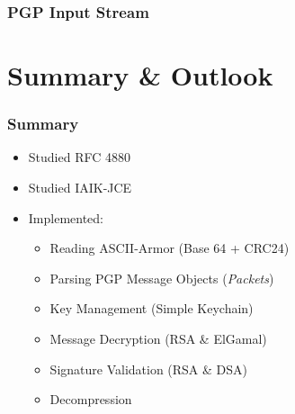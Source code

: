 \documentclass{beamer}
\begin{document}

\begin{frame}[fragile]
	\frametitle{PGP Input Stream}
	
\end{frame}

\section{Summary \&{} Outlook}

\begin{frame}
	\frametitle{Summary}
	
	\begin{itemize}
		\item Studied RFC 4880
		\item Studied IAIK-JCE
		\item Implemented:
		\begin{itemize}
			\item Reading ASCII-Armor (Base 64 + CRC24)
			\item Parsing PGP Message Objects (\textit{Packets})
			\item Key Management (Simple Keychain)
			\item Message Decryption (RSA \&{} ElGamal)
			\item Signature Validation (RSA \&{} DSA)
			\item Decompression
		\end{itemize}
	\end{itemize}
	
\end{frame}

\end{document}
